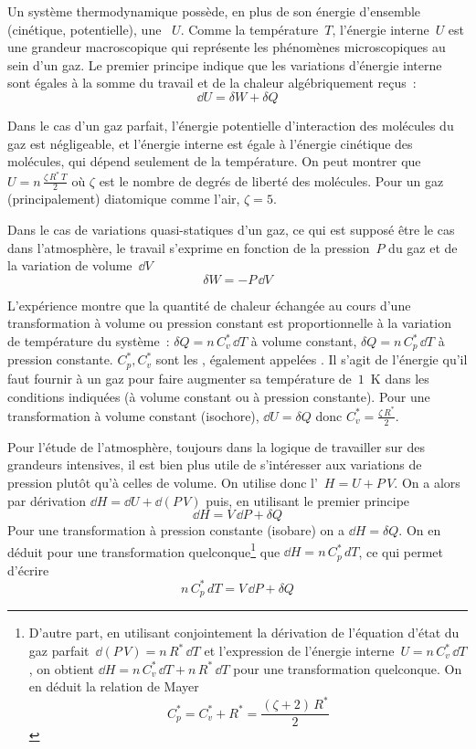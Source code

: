 \sk
Un système thermodynamique possède, en plus de son énergie d'ensemble (cinétique, potentielle), une ~$U$. Comme la température~$T$, l'énergie interne~$U$ est une grandeur macroscopique qui représente les phénomènes microscopiques au sein d'un gaz. Le premier principe indique que les variations d'énergie interne sont égales à la somme du travail et de
la chaleur algébriquement reçus~:
\[ \dd U = \delta W + \delta Q\]

\sk
Dans le cas d'un gaz parfait, l'énergie potentielle d'interaction des molécules du gaz est négligeable, et l'énergie interne est égale à l'énergie cinétique des molécules, qui dépend seulement de la température. On peut montrer que $U = n \, \frac{\zeta \, R^* \, T}{2}$ où $\zeta$ est le nombre de degrés de liberté des molécules. Pour un gaz (principalement) diatomique comme l'air, $\zeta = 5$. 

\sk
Dans le cas de variations quasi-statiques d'un gaz, ce qui est supposé être le cas dans l'atmosphère, le travail s'exprime en fonction de la pression~$P$ du gaz et de la variation de volume~$\dd V$
\[ \delta W = - P \, \dd V \]

\sk
L'expérience montre que la quantité de chaleur échangée au cours d'une transformation à volume ou pression constant est proportionnelle à la variation de température du système~: $\delta Q = n \, C_v^* \, \dd T$ à volume constant, $\delta Q = n \, C_p^* \, \dd T$ à pression constante. $C_p^*, C_v^*$ sont les , également appelées . Il s'agit de l'énergie qu'il faut fournir à un gaz pour faire augmenter sa température de~$1$~K dans les conditions indiquées (à volume constant ou à pression constante). Pour une transformation à volume constant (isochore), $\dd U = \delta Q$ donc $C_v^*=\frac{\zeta \, R^*}{2}$.

\sk
Pour l'étude de l'atmosphère, toujours dans la logique de travailler sur des grandeurs intensives, il est  bien plus utile de s'intéresser aux variations de pression plutôt qu'à celles de volume. On utilise donc l'~$H = U + P \, V$. On a alors par dérivation $ \dd H = \dd U + \dd (P\,V) $ puis, en utilisant le premier principe
\[ \dd H = V \, \dd P + \delta Q \]
Pour une transformation à pression constante (isobare) on a $\dd H = \delta Q$. On en déduit pour une transformation quelconque\footnote{
D'autre part, en utilisant conjointement la dérivation de l'équation d'état du gaz parfait~$\dd (P\,V) = n \, R^* \, \dd T$ et l'expression de l'énergie interne~$U = n \, C_v^* \, \dd T$, on obtient $\dd H = n \, C_v^* \, \dd T + n \, R^* \, \dd T$ pour une transformation quelconque. On en déduit la relation de Mayer \[ C_p^* = C_v^* + R^* = \frac{(\zeta+2) \, R^*}{2}\]
} 
que $\dd H = n \, C_p^* \, dT$, ce qui permet d'écrire
\[ n \, C_p^* \, dT = V \, \dd P + \delta Q \]



